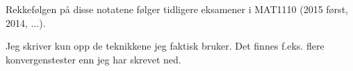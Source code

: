 Rekkefølgen på disse notatene følger tidligere eksamener
i MAT1110 (2015 først, 2014, ...).

Jeg skriver kun opp de teknikkene jeg faktisk bruker.
Det finnes f.eks. flere konvergenstester enn jeg har skrevet ned.
